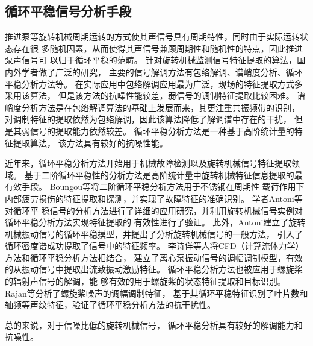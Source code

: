 \subsection{循环平稳信号分析手段}
推进泵等旋转机械周期运转的方式使其声信号具有周期特性，同时由于实际运转状态存在很
多随机因素，从而使得其声信号兼顾周期性和随机性的特点，因此推进泵声信号可
以归于循环平稳的范畴\cite{陈进2013机械故障特征提取的循环平稳理论及方法}。
针对旋转机械监测信号特征提取的算法，国内外学者做了广泛的研究，
主要的信号解调方法有包络解调、谱峭度分析、循环平稳分析方法等\cite{wangSpectralKurtosisFault2016}。
在实际应用中包络解调应用最为广泛，现场的特征提取方式多采用该算法，
但是该方法的抗噪性能较差，弱信号的调制特征提取比较困难\cite{abboudEnvelopeAnalysisRotating2017,2014The}。
谱峭度分析方法是在包络解调算法的基础上发展而来，其更注重共振频带的识别，
对调制特征的提取依然为包络解调，因此该算法降低了解调谱中存在的干扰，
但是其弱信号的提取能力依然较差\cite{2007Fast,2011A}。
循环平稳分析方法是一种基于高阶统计量的特征提取算法，
该方法具有较好的抗噪性能\cite{gardnerCyclostationarityHalfCentury2006,songRobustPassiveUnderwater2019}。

近年来，循环平稳分析方法开始用于机械故障检测以及旋转机械信号特征提取领域\cite{2006Detecting,poirierExtrapolationDynamicLoad2017,fengGearDamageAssessment2011,何俊2007,antoniCyclicSpectralAnalysis2007a,2017Extrapolation}。
基于二阶循环平稳性的分析方法是高阶统计量中旋转机械特征信息提取的最有效手段\cite{antoniUseCyclicPower2005}。
Boungou等\cite{boungouFatigueDamageDetection2015}将二阶循环平稳分析方法用于不锈钢在周期性
载荷作用下内部疲劳损伤的特征提取和探测，并实现了故障特征的准确识别。
学者Antoni等\cite{antoniCyclostationarityExamples2009}对循环平
稳信号的分析方法进行了详细的应用研究，并利用旋转机械信号实例对循环平稳分析方法实现特征提取的
有效性进行了验证。
此外，Antoni建立了旋转机械振动信号的循环平稳摸型，并提出了分析旋转机械信号的一般方法，
引入了循环密度谱成功提取了信号中的特征频率\cite{antoniCyclostationaryModellingRotating2004a}。
李诗佯等\cite{2019Cyclostationary}人将CFD（计算流体力学）方法和循环平稳分析方法相结合，
建立了离心泵振动信号的调幅调制模型，有效的从振动信号中提取出流致振动激励特征。
循环平稳分析方法也被应用于螺旋桨的辐射声信号的解调，能
够有效的用于螺旋桨的状态特征提取和目标识别\cite{antoniDetectionSurfaceShips2012,2016Cyclostationary}。
Rajan等\cite{rajanCyclostationarityBasedSonar2016}分析了螺旋桨噪声的调幅调制特征，
基于其循环平稳特征识别了叶片数和轴频等声纹特征，验证了循环平稳分析方法的抗干扰性。

总的来说，对于信噪比低的旋转机械信号，
循环平稳分析具有较好的解调能力和抗噪性。


